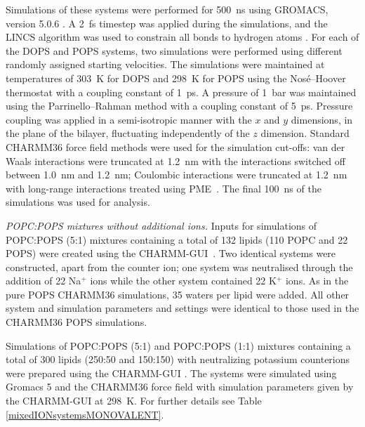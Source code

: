 \documentclass[journal=jpcbfk,manuscript=article]{achemso}
\newcommand{\todo}[1]{\textcolor{red}{#1}}
\begin{document}
Simulations of these systems were performed for 500~ns using GROMACS, version 5.0.6 \cite{abraham2015gromacs}.
A 2~fs timestep was applied during the simulations, and the LINCS algorithm was used to constrain all bonds to hydrogen atoms \cite{hess97,hess07}.
For each of the DOPS and POPS systems, two simulations were performed using different randomly assigned starting velocities.
The simulations were maintained at temperatures of 303~K for DOPS and 298~K for POPS using the Nos\'{e}--Hoover thermostat \cite{nose84,hoover85}
with a coupling constant of 1~ps. A pressure of 1~bar was maintained using the Parrinello--Rahman \cite{parrinello81} method with a coupling constant of 5~ps.
Pressure coupling was applied in a semi-isotropic manner with the $x$ and $y$ dimensions, in the plane of the bilayer, fluctuating independently of the $z$ dimension.
Standard CHARMM36 force field methods were used for the simulation cut-offs: van der Waals interactions were truncated at 1.2~nm with the interactions
switched off between 1.0~nm and 1.2~nm; Coulombic interactions were truncated at 1.2~nm with long-range interactions treated using PME~\cite{darden93,essman95}. The final 100~ns of the simulations was used for analysis.



\noindent
{\it POPC:POPS mixtures without additional ions.}
Inputs for simulations of POPC:POPS (5:1) mixtures containing a total of 132 lipids (110 POPC and 22 POPS) were created using the CHARMM-GUI~\cite{lee16,jo18}. Two identical systems were constructed, apart from the counter ion; one system was neutralised through the addition of 22 Na$^+$ ions while the other system
contained 22 K$^+$ ions. As in the pure POPS CHARMM36 simulations, 35 waters per lipid were added. All other system and simulation parameters
and settings were identical to those used in the CHARMM36 POPS simulations.



Simulations of POPC:POPS (5:1) and POPC:POPS (1:1) mixtures containing a total of 300 lipids (250:50 and 150:150)
with neutralizing potassium counterions 
were prepared
using the CHARMM-GUI \cite{lee16,jo18}. The systems were simulated using Gromacs 5 \cite{abraham2015gromacs}
and the CHARMM36 force field with simulation parameters given by the CHARMM-GUI at 298~K. For further details see Table \ref{mixedIONsystemsMONOVALENT}. 
 
\end{document}

